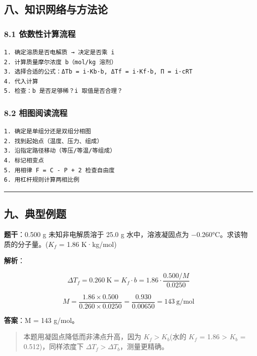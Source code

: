 \documentclass[a4paper,11pt]{ctexart}
\newcommand{\箭}{\ensuremath{\rightarrow}}
\newcommand{\左箭}{\ensuremath{\leftarrow}}
\newcommand{\上箭}{\ensuremath{\uparrow}}
\newcommand{\下箭}{\ensuremath{\downarrow}}
\newcommand{\衡}{\ensuremath{\rightleftharpoons}}
\newcommand{\双箭}{\ensuremath{\leftrightarrow}}
\newcommand{\约等于}{\ensuremath{\approx}}
\newcommand{\小于等于}{\ensuremath{\leq}}
\newcommand{\大于等于}{\ensuremath{\geq}}
\newcommand{\不等于}{\ensuremath{\neq}}
\newcommand{\西格马}{\ensuremath{\sigma}}
\newcommand{\派}{\ensuremath{\pi}}
\begin{document}
\subsection{八、知识网络与方法论}\label{ux516bux77e5ux8bc6ux7f51ux7edcux4e0eux65b9ux6cd5ux8bba}

\subsubsection{8.1 依数性计算流程}\label{ux4f9dux6570ux6027ux8ba1ux7b97ux6d41ux7a0b}

\begin{verbatim}
1. 确定溶质是否电解质 → 决定是否乘 i
2. 计算质量摩尔浓度 b（mol/kg 溶剂）
3. 选择合适的公式：ΔTb = i·Kb·b, ΔTf = i·Kf·b, Π = i·cRT
4. 代入计算
5. 检查：b 是否足够稀？i 取值是否合理？
\end{verbatim}

\subsubsection{8.2 相图阅读流程}\label{ux76f8ux56feux9605ux8bfbux6d41ux7a0b}

\begin{verbatim}
1. 确定是单组分还是双组分相图
2. 找到起始点（温度、压力、组成）
3. 沿指定路径移动（等压/等温/等组成）
4. 标记相变点
5. 用相律 F = C - P + 2 检查自由度
6. 用杠杆规则计算两相比例
\end{verbatim}

\begin{center}\rule{0.5\linewidth}{0.5pt}\end{center}

\subsection{九、典型例题}\label{ux4e5dux5178ux578bux4f8bux9898}

\textbf{题干}：0.500 g 未知非电解质溶于 25.0 g 水中，溶液凝固点为 −0.260°C。求该物质的分子量。(\(K_f\) = 1.86 K·kg/mol)

\textbf{解析}：

\[\Delta T_f = 0.260\ \mathrm{K} = K_f \cdot b = 1.86 \cdot \frac{0.500/M}{0.0250}\]

\[M = \frac{1.86 \times 0.500}{0.260 \times 0.0250} = \frac{0.930}{0.00650} = 143\ \mathrm{g/mol}\]

\textbf{答案}：M = 143 g/mol。

\begin{quote}
本题用凝固点降低而非沸点升高，因为 \(K_f > K_b\)(水的 \(K_f\) = 1.86 \textgreater{} \(K_b\) = 0.512)，同样浓度下 \(\Delta T_f > \Delta T_b\)，测量更精确。
\end{quote}
\end{document}
